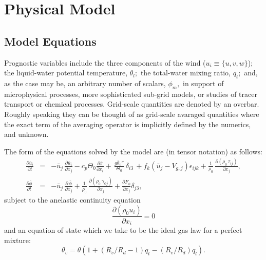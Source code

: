 \documentclass[11pt,a4paper]{article}
\begin{document}
\section{Physical Model}
\subsection{Model Equations}

Prognostic variables include the three components of the wind
($u_i \equiv \{u,v,w\}$); the liquid-water potential
temperature, $\theta_l;$ the total-water mixing ratio, $q_t;$ and, as
the case may be, an arbitrary number of scalars, $\phi_m,$ in support
of microphysical processes, more sophisticated sub-grid models, or
studies of tracer transport or chemical processes. Grid-scale quantities
are denoted by an overbar. Roughly speaking they can be thought of as
grid-scale avaraged quantities where the exact term of the averaging
operator is implicitly defined by the numerics, and unknown.

The form of the equations solved by the model are (in tensor notation)
as follows:
\begin{eqnarray}
\frac{\partial \bar{u}_i}{\partial t} & = &- \bar{u}_j \,
\frac{\partial \bar{u}_i}{\partial x_j} - c_p \Theta_0 \frac{\partial
\bar{\pi}}{\partial x_i} + \, \frac{g \bar{\theta}_v ''}{\Theta_0} \,
\delta_{i3} \, + f_k (\bar{u}_j - V_{g,j}) \epsilon_{ijk} +
\frac{1}{\rho_0} \, \frac{\partial (\rho_0 \, \tau_{ij})} {\partial
x_j} ,
\label{eq:FM} \\
\frac{\partial \bar{\phi}}{\partial t} & = & - \bar{u}_j \,
\frac{\partial \, \bar{\phi}}{\partial x_j} + \frac{1}{\rho_0} \,
\frac{\partial (\rho_0 \, \gamma_{\phi j})} {\partial x_j} +
\frac{\partial F_{\phi}}{\partial x_j} \delta_{j3} ,
\label{eq:FTD}
\end{eqnarray}
subject to the anelastic continuity equation
\begin{equation}
\frac{\partial (\rho_0 u_i) }{\partial x_i} = 0 \label{eq:continuity}
\end{equation}
and an equation of state which we take to be the ideal gas law for
a perfect mixture:
\begin{equation}
\theta_v = \theta\left(1 + (R_v/R_d-1)q_t - (R_v/R_d)q_l\right).
\end{equation}
\end{document}
